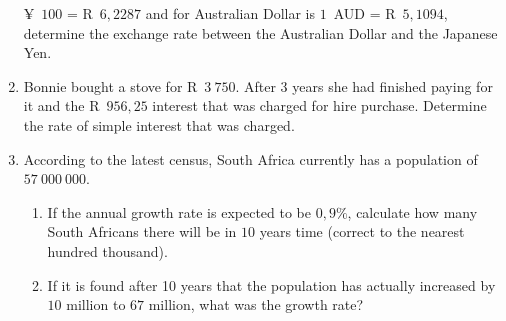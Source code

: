 \begin{eocexercises}{}
\begin{enumerate}[label=\textbf{\arabic*}.]
          ¥~$100$ = R~$6,2287$ and for Australian Dollar is $1$~AUD =
          R~$5,1094$, determine the exchange rate between the
          Australian Dollar and the Japanese Yen.
	\item Bonnie bought a stove for R~$3~750$. After $3$ years she had finished paying for it and the R~$956,25$ interest that was charged for hire purchase. Determine the rate of simple interest that was charged.
	\item According to the latest census, South Africa currently has a population of $57~000~000$.
	\begin{enumerate}[noitemsep, label=\textbf{(\alph*)} ]
	    \item If the annual growth rate is expected to be $0,9\%$, calculate how many South Africans there will be in $10$ years time (correct to the nearest hundred thousand).

	    \item If it is found after 10 years that the population has actually increased by $10$ million to $67$ million, what was the growth rate?
	\end{enumerate}
    \end{enumerate}
\end{eocexercises}



